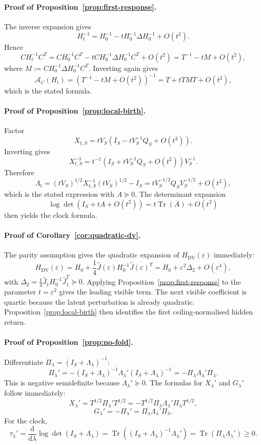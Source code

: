 \documentclass[11pt,a4paper]{article}
\numberwithin{equation}{section}
\DeclareMathOperator{\Tr}{Tr}
\newcommand{\Aobs}{\mathcal A}
\newcommand{\dd}{\mathrm d}
\newcommand{\eps}{\varepsilon}
\theoremstyle{thmcompact}
\theoremstyle{remark}
\begin{document}
\paragraph{Proof of Proposition~\ref{prop:first-response}.}
The inverse expansion gives
\[
H_t^{-1}=H_0^{-1}-tH_0^{-1}\Delta H_0^{-1}+O(t^2).
\]
Hence
\[
CH_t^{-1}C^T
=
CH_0^{-1}C^T-tCH_0^{-1}\Delta H_0^{-1}C^T+O(t^2)
=
T^{-1}-tM+O(t^2),
\]
where \(M:=CH_0^{-1}\Delta H_0^{-1}C^T\). Inverting again gives
\[
\Aobs_C(H_t)
=(T^{-1}-tM+O(t^2))^{-1}
=
T+tTMT+O(t^2),
\]
which is the stated formula.

\paragraph{Proof of Proposition~\ref{prop:local-birth}.}
Factor
\[
X_{t,S}=tV_S(I_S-tV_S^{-1}Q_S+O(t^2)).
\]
Inverting gives
\[
X_{t,S}^{-1}
=
t^{-1}(I_S+tV_S^{-1}Q_S+O(t^2))V_S^{-1}.
\]
Therefore
\[
\Lambda_t
=(tV_S)^{1/2}X_{t,S}^{-1}(tV_S)^{1/2}-I_S
=
tV_S^{-1/2}Q_SV_S^{-1/2}+O(t^2),
\]
which is the stated expression with \(A\succeq0\). The determinant expansion
\[
\log\det(I_S+tA+O(t^2))=t\Tr(A)+O(t^2)
\]
then yields the clock formula.

\paragraph{Proof of Corollary~\ref{cor:quadratic-dv}.}
The parity assumption gives the quadratic expansion of \(H_{\mathrm{DV}}(\eps)\) immediately:
\[
H_{\mathrm{DV}}(\eps)
=
H_0+\frac14\widehat J(\eps)H_0^{-1}\widehat J(\eps)^T
=
H_0+\eps^2\Delta_2+O(\eps^4),
\]
with \(\Delta_2=\frac14\widehat J_1H_0^{-1}\widehat J_1^T\succeq0\). Applying Proposition~\ref{prop:first-response} to the parameter \(t=\eps^2\) gives the leading visible term. The next visible coefficient is quartic because the latent perturbation is already quadratic. Proposition~\ref{prop:local-birth} then identifies the first ceiling-normalised hidden return.

\paragraph{Proof of Proposition~\ref{prop:no-fold}.}
Differentiate \(\Pi_\lambda=(I_S+\Lambda_\lambda)^{-1}\):
\[
\Pi_\lambda'
=
-(I_S+\Lambda_\lambda)^{-1}\Lambda_\lambda'(I_S+\Lambda_\lambda)^{-1}
=
-\Pi_\lambda \Lambda_\lambda' \Pi_\lambda.
\]
This is negative semidefinite because \(\Lambda_\lambda'\succeq0\). The formulas for \(X_\lambda'\) and \(G_\lambda'\) follow immediately:
\[
X_\lambda'
=
T^{1/2}\Pi_\lambda' T^{1/2}
=
-T^{1/2}\Pi_\lambda \Lambda_\lambda' \Pi_\lambda T^{1/2},
\]
\[
G_\lambda'=-\Pi_\lambda'=\Pi_\lambda \Lambda_\lambda' \Pi_\lambda.
\]
For the clock,
\[
\tau_\lambda'
=
\frac{\dd}{\dd\lambda}\log\det(I_S+\Lambda_\lambda)
=
\Tr((I_S+\Lambda_\lambda)^{-1}\Lambda_\lambda')
=
\Tr(\Pi_\lambda \Lambda_\lambda')
\ge 0.
\]
\end{document}
